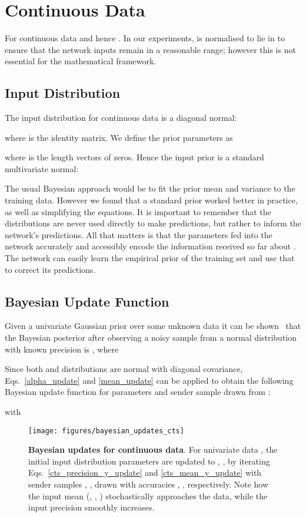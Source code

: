 \documentclass[11pt,table]{article}
\newcommand{\0}[1]{\constvec{0}{#1}}
\newcommand{\1}[1]{\constvec{1}{#1}}
\begin{document}
\section{Continuous Data}\label{sec:cts}
For continuous data  and hence .
In our experiments,  is normalised to lie in  to ensure that the network inputs remain in a reasonable range; however this is not essential for the mathematical framework.
\subsection{Input Distribution \texorpdfstring{}{}}\label{sec:cts_input}
The input distribution for continuous data is a diagonal normal:

where  is the  identity matrix. 
We define the prior parameters as

where  is the length  vectors of zeros.
Hence the input prior is a standard multivariate normal:

The usual Bayesian approach would be to fit the prior mean and variance to the training data. 
However we found that a standard prior worked better in practice, as well as simplifying the equations. 
It is important to remember that the distributions  are never used directly to make predictions, but rather to inform the network's predictions. 
All that matters is that the parameters fed into the network accurately and accessibly encode the information received so far about . 
The network can easily learn the empirical prior of the training set and use that to correct its predictions.
\subsection{Bayesian Update Function \texorpdfstring{}{}}
Given a univariate Gaussian prior  over some unknown data  it can be shown~\citep{murphy2007conjugate} that the Bayesian posterior after observing a noisy sample  from a normal distribution  with known precision  is , where

Since both  and  distributions are normal with diagonal covariance,  Eqs.~\ref{alpha_update} and \ref{mean_update} can be applied to obtain the following Bayesian update function for parameters  and sender sample  drawn from :

with

\begin{figure}[t!]
\texttt{[image: figures/bayesian\_updates\_cts]}
\caption{\textbf{Bayesian updates for continuous data}. For univariate data , the initial input distribution parameters  are updated to , ,  by iterating Eqs.~\ref{cts_precision_y_update} and \ref{cts_mean_y_update} with sender samples , ,  drawn with accuracies , ,  respectively. Note how the input mean (, , ) stochastically approaches the data, while the input precision smoothly increases.}
\end{figure}
\end{document}
